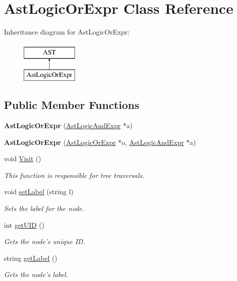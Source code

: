 \hypertarget{classAstLogicOrExpr}{\section{Ast\-Logic\-Or\-Expr Class Reference}
\label{classAstLogicOrExpr}
}
Inheritance diagram for Ast\-Logic\-Or\-Expr\-:\begin{figure}[H]
\begin{center}
\leavevmode
\includegraphics[height=2.000000cm]{classAstLogicOrExpr}
\end{center}
\end{figure}
\subsection*{Public Member Functions}
\begin{DoxyCompactItemize}
\item 
\hypertarget{classAstLogicOrExpr_a9e3103b546a45090ba81ae88fe72b72e}{{\bfseries Ast\-Logic\-Or\-Expr} (\hyperlink{classAstLogicAndExpr}{Ast\-Logic\-And\-Expr} $\ast$a)}\label{classAstLogicOrExpr_a9e3103b546a45090ba81ae88fe72b72e}

\item 
\hypertarget{classAstLogicOrExpr_ade933ad4ec401ffc0dabfb19706fb341}{{\bfseries Ast\-Logic\-Or\-Expr} (\hyperlink{classAstLogicOrExpr}{Ast\-Logic\-Or\-Expr} $\ast$o, \hyperlink{classAstLogicAndExpr}{Ast\-Logic\-And\-Expr} $\ast$a)}\label{classAstLogicOrExpr_ade933ad4ec401ffc0dabfb19706fb341}

\item 
void \hyperlink{classAstLogicOrExpr_acdcdda8eae9c03d8175bbb3527c783eb}{Visit} ()
\begin{DoxyCompactList}\small\item\em This function is responsible for tree traversals. \end{DoxyCompactList}\item 
void \hyperlink{classAST_a71d680856e95ff89f55d5311a552eba6}{set\-Label} (string l)
\begin{DoxyCompactList}\small\item\em Sets the label for the node. \end{DoxyCompactList}\item 
int \hyperlink{classAST_ab7a5b1d9f1c2de0d98deb356f724a42c}{get\-U\-I\-D} ()
\begin{DoxyCompactList}\small\item\em Gets the node's unique I\-D. \end{DoxyCompactList}\item 
string \hyperlink{classAST_aee029be902fffc927d16ccb03eb922ad}{get\-Label} ()
\begin{DoxyCompactList}\small\item\em Gets the node's label. \end{DoxyCompactList}\end{DoxyCompactItemize}
